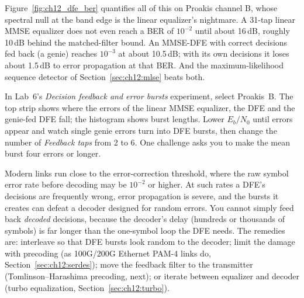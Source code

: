 Figure~\ref{fig:ch12_dfe_ber} quantifies all of this on Proakis channel B, whose spectral null at the
band edge is the linear equalizer's nightmare. A 31-tap linear MMSE equalizer does not even
reach a BER of $10^{-2}$ until about 16\,dB, roughly 10\,dB behind the matched-filter bound. An
MMSE-DFE with correct decisions fed back (a genie) reaches $10^{-3}$ at about 10.5\,dB; with its own
decisions it loses about 1.5\,dB to error propagation at that BER. And the maximum-likelihood
sequence detector of Section~\ref{sec:ch12:mlse} beats both.


\begin{tryit}
In Lab~6's \emph{Decision feedback and error bursts} experiment, select Proakis~B. The top strip
shows where the errors of the linear MMSE equalizer, the DFE and the genie-fed DFE fall; the
histogram shows burst lengths. Lower $E_b/N_0$ until errors appear and watch single genie errors
turn into DFE bursts, then change the number of \emph{Feedback taps} from 2 to 6. One challenge asks
you to make the mean burst four errors or longer.
\end{tryit}

\begin{pitfall}
Modern links run close to the error-correction threshold, where the raw symbol error rate before
decoding may be $10^{-2}$ or higher. At such rates a DFE's decisions are frequently wrong, error
propagation is severe, and the bursts it creates can defeat a decoder designed for random errors. You
cannot simply feed back \emph{decoded} decisions, because the decoder's delay (hundreds or thousands of
symbols) is far longer than the one-symbol loop the DFE needs. The remedies are: interleave so that
DFE bursts look random to the decoder; limit the damage with precoding (as 100G/200G Ethernet PAM-4
links do, Section~\ref{sec:ch12:serdes}); move the feedback filter to the transmitter
(Tomlinson--Harashima precoding, next); or iterate between equalizer and decoder (turbo equalization,
Section~\ref{sec:ch12:turbo}).
\end{pitfall}

